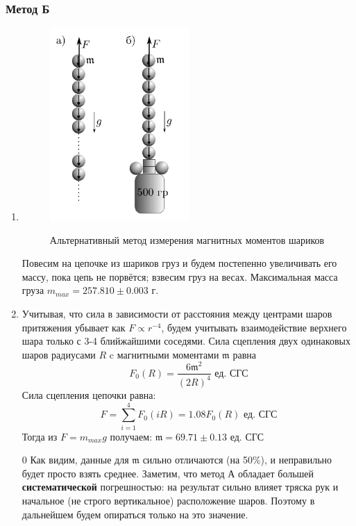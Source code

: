\documentclass[12pt,a4paper]{article}
\newcommand{\mk}{\mathfrak}
\begin{document}
\subsubsection{Метод Б}
\begin{enumerate}
  \item \begin{figure}[H]
    \includegraphics*[width=0.5\textwidth]{2023-10-02-00-43-23.png}
    \label{ust:met_b}
    \caption{Альтернативный ме­тод измерения магнитных
    моментов шариков}
  \end{figure}
  Повесим на цепочке из  шариков груз и будем постепенно увеличивать его массу, пока цепь не порвётся; взвесим груз на весах. Максимальная масса груза $m_{max} = 257.810 \pm 0.003$ г.
  \item Учитывая, что
  сила в зависимости от расстояния между центрами шаров притяжения убывает как $F\varpropto r^{-4}$, будем учитывать взаимодействие верхнего шара только с 3-4 блийжайшими соседями. Сила сцепления двух одинаковых шаров радиусами $R$ c магнитными моментами $\mathfrak{m}$ равна $$F_0(R) = \frac{6\mk m^2}{(2R)^4} \text{ ед. СГС}$$
  Сила сцепления цепочки равна:  
  $$F = \sum_{i=1}^{4} F_0(iR)= 1.08 F_0(R)\text{ ед. СГС}$$ Тогда из $F = m_{max}g$ получаем: 
   \underline{$\mk m = 69.71 \pm 0.13 \text{ ед. СГС}$}
   \item[0] Как видим, данные для $\mk m$ сильно отличаются (на 50\%), и неправильно будет просто взять среднее. Заметим, что метод А обладает большей \textbf{систематической} погрешностью: на результат сильно влияет тряска рук и начальное (не строго вертикальное) расположение шаров. Поэтому в дальнейшем будем опираться только на это значение.
\end{enumerate}
\end{document}
